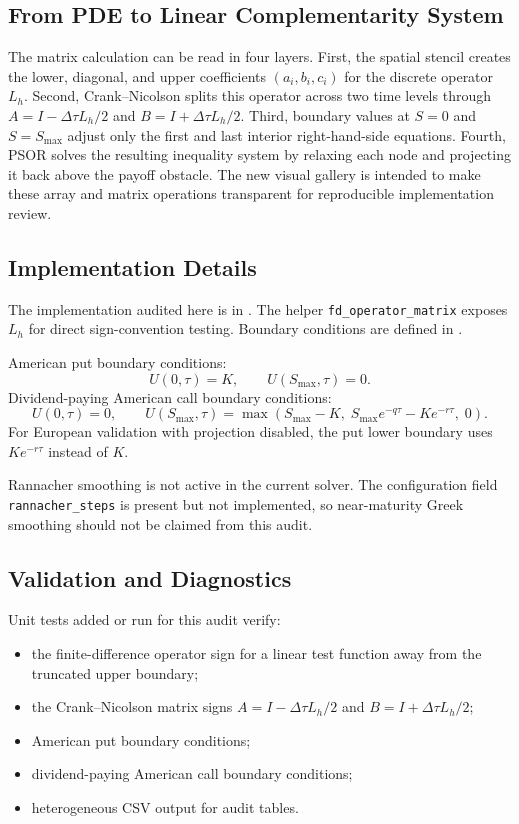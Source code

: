 \documentclass[11pt]{article}
\begin{document}
\subsection{From PDE to Linear Complementarity System}
The matrix calculation can be read in four layers. First, the spatial stencil creates the lower, diagonal, and upper coefficients $(a_i,b_i,c_i)$ for the discrete operator $L_h$. Second, Crank--Nicolson splits this operator across two time levels through $A=I-\Delta\tau L_h/2$ and $B=I+\Delta\tau L_h/2$. Third, boundary values at $S=0$ and $S=S_{\max}$ adjust only the first and last interior right-hand-side equations. Fourth, PSOR solves the resulting inequality system by relaxing each node and projecting it back above the payoff obstacle. The new visual gallery is intended to make these array and matrix operations transparent for reproducible implementation review.

\subsection{Implementation Details}
The implementation audited here is in . The helper
\texttt{fd\_operator\_matrix} exposes $L_h$ for direct sign-convention testing.
Boundary conditions are defined in .

American put boundary conditions:
\[
U(0,\tau)=K,\qquad U(S_{\max},\tau)=0.
\]
Dividend-paying American call boundary conditions:
\[
U(0,\tau)=0,\qquad
U(S_{\max},\tau)=\max(S_{\max}-K,\; S_{\max}e^{-q\tau}-Ke^{-r\tau},\;0).
\]
For European validation with projection disabled, the put lower boundary uses $Ke^{-r\tau}$ instead of $K$.

Rannacher smoothing is not active in the current solver. The configuration field \texttt{rannacher\_steps} is present but not implemented, so near-maturity Greek smoothing should not be claimed from this audit.

\subsection{Validation and Diagnostics}
Unit tests added or run for this audit verify:
\begin{itemize}
  \item the finite-difference operator sign for a linear test function away from the truncated upper boundary;
  \item the Crank--Nicolson matrix signs $A=I-\Delta\tau L_h/2$ and $B=I+\Delta\tau L_h/2$;
  \item American put boundary conditions;
  \item dividend-paying American call boundary conditions;
  \item heterogeneous CSV output for audit tables.
\end{itemize}
\end{document}
